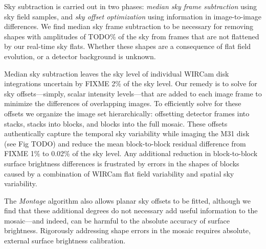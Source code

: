 \documentclass[iop]{emulateapj}
\newcommand{\eg}{\textit{e.g.,~}}
\newcommand{\sw}[1]{\textit{#1}} %
\begin{document}
Sky subtraction is carried out in two phases: \emph{median sky frame subtraction} using sky field samples, and \emph{sky offset optimization} using information in image-to-image differences. We find median sky frame subtraction to be necessary for removing shapes with amplitudes of TODO\% of the sky from frames that are not flattened by our real-time sky flats. Whether these shapes are a consequence of flat field evolution, or a detector background \citep[\eg][]{Vaduvescu:2004} is unknown.

Median sky subtraction leaves the sky level of individual WIRCam disk integrations uncertain by FIXME 2\% of the sky level. Our remedy is to solve for sky offsets---simply, scalar intensity levels---that are added to each image frame to minimize the differences of overlapping images. To efficiently solve for these offsets we organize the image set hierarchically: offsetting detector frames into stacks, stacks into blocks, and blocks into the full mosaic. These offsets authentically capture the temporal sky variability while imaging the M31 disk (see Fig TODO) and reduce the mean block-to-block residual difference from FIXME 1\% to 0.02\% of the sky level. Any additional reduction in block-to-block surface brightness differences is frustrated by errors in the shapes of blocks caused by a combination of WIRCam flat field variability and spatial sky variability.

The \sw{Montage} algorithm also allows planar sky offsets to be fitted, although we find that these additional degrees do not necessary add useful information to the mosaic---and indeed, can be harmful to the absolute accuracy of surface brightness. Rigorously addressing shape errors in the mosaic requires absolute, external surface brightness calibration.
\end{document}
